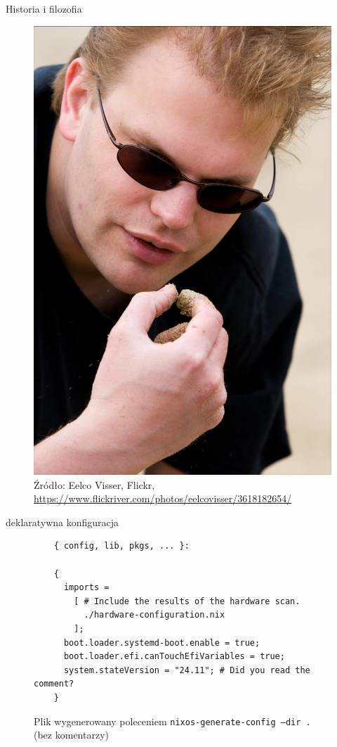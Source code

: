 \documentclass{beamer}
\begin{document}
\begin{frame}{Historia i filozofia}
    \begin{figure}
        \includegraphics[height=0.75\textheight]{./assets/eelco.jpg}
        \caption*{\scriptsize Źródło: Eelco Visser, Flickr, \url{https://www.flickriver.com/photos/eelcovisser/3618182654/}}
    \end{figure}
\end{frame}

\begin{frame}{deklaratywna konfiguracja}
    \begin{figure}
    \caption*{\small Plik wygenerowany poleceniem \texttt{nixos-generate-config --dir .} (bez komentarzy)}
    \begin{verbatim}
    { config, lib, pkgs, ... }:

    {
      imports =
        [ # Include the results of the hardware scan.
          ./hardware-configuration.nix
        ];
      boot.loader.systemd-boot.enable = true;
      boot.loader.efi.canTouchEfiVariables = true;
      system.stateVersion = "24.11"; # Did you read the comment?
    }
    \end{verbatim}
    \end{figure}
\end{frame}
\end{document}

